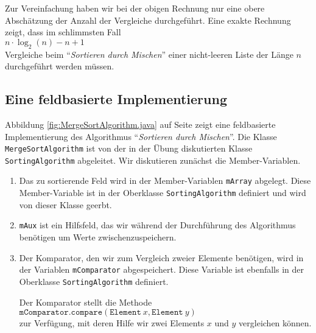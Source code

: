Zur Vereinfachung haben wir bei der obigen Rechnung nur eine obere Absch\"atzung
der Anzahl der Vergleiche durchgef\"uhrt.  Eine exakte Rechnung zeigt, dass im
schlimmsten Fall \\[0.2cm]
\hspace*{1.3cm}  $n \cdot \log_2(n) - n + 1$ \\[0.2cm]
Vergleiche beim ``\emph{Sortieren durch Mischen}'' einer nicht-leeren Liste der L\"ange $n$
durchgef\"uhrt werden m\"ussen.

\subsection{Eine feldbasierte Implementierung}
Abbildung \ref{fig:MergeSortAlgorithm.java} auf Seite \pageref{fig:MergeSortAlgorithm.java}
zeigt eine feldbasierte  Implementierung des Algorithmus ``\emph{Sortieren durch
  Mischen}''.  Die Klasse \texttt{MergeSortAlgorithm} ist von der in der \"Ubung
diskutierten Klasse \texttt{SortingAlgorithm} abgeleitet.
Wir diskutieren zun\"achst die Member-Variablen.
\begin{enumerate}
\item Das zu sortierende Feld wird in der Member-Variablen \texttt{mArray} 
      abgelegt.  Diese Member-Variable ist in der Oberklasse \texttt{SortingAlgorithm}
      definiert und wird von dieser Klasse geerbt.
\item \texttt{mAux} ist ein Hilfsfeld, das wir w\"ahrend der Durchf\"uhrung des Algorithmus
      ben\"otigen um Werte zwischenzuspeichern.
\item Der Komparator, den wir zum Vergleich zweier Elemente ben\"otigen,
      wird in der Variablen \texttt{mComparator} abgespeichert.  Diese Variable ist
      ebenfalls in der Oberklasse \texttt{SortingAlgorithm} definiert.
      
      Der Komparator stellt die Methode \\[0.2cm]
      \hspace*{1.3cm} 
      $\texttt{mComparator.compare}(\mathtt{Element}\ x, \mathtt{Element}\ y)$  \\[0.2cm]
      zur Verf\"ugung, mit deren Hilfe wir zwei Elements $x$ und $y$ vergleichen k\"onnen.
\end{enumerate}

